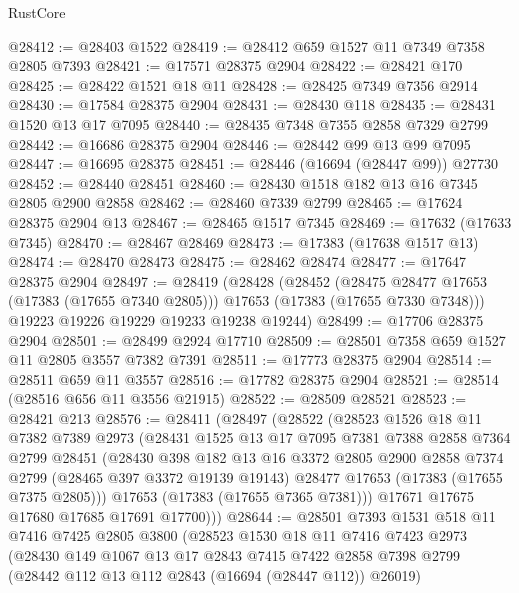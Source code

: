 \begin{lexlean}{RustCore}
\begin{coremodule}
@28412 := @28403 @1522
@28419 := @28412 @659 @1527 @11 @7349 @7358 @2805 @7393
@28421 := @17571 @28375 @2904
@28422 := @28421 @170
@28425 := @28422 @1521 @18 @11
@28428 := @28425 @7349 @7356 @2914
@28430 := @17584 @28375 @2904
@28431 := @28430 @118
@28435 := @28431 @1520 @13 @17 @7095
@28440 := @28435 @7348 @7355 @2858 @7329 @2799
@28442 := @16686 @28375 @2904
@28446 := @28442 @99 @13 @99 @7095
@28447 := @16695 @28375
@28451 := @28446 (@16694 (@28447 @99)) @27730
@28452 := @28440 @28451
@28460 := @28430 @1518 @182 @13 @16 @7345 @2805 @2900 @2858
@28462 := @28460 @7339 @2799
@28465 := @17624 @28375 @2904 @13
@28467 := @28465 @1517 @7345
@28469 := @17632 (@17633 @7345)
@28470 := @28467 @28469
@28473 := @17383 (@17638 @1517 @13)
@28474 := @28470 @28473
@28475 := @28462 @28474
@28477 := @17647 @28375 @2904
@28497 := @28419
    (@28428
      (@28452
        (@28475 @28477 @17653 (@17383 (@17655 @7340 @2805)))
        @17653
        (@17383 (@17655 @7330 @7348)))
      @19223
      @19226
      @19229
      @19233
      @19238
      @19244)
@28499 := @17706 @28375 @2904
@28501 := @28499 @2924 @17710
@28509 := @28501 @7358 @659 @1527 @11 @2805 @3557 @7382 @7391
@28511 := @17773 @28375 @2904
@28514 := @28511 @659 @11 @3557
@28516 := @17782 @28375 @2904
@28521 := @28514 (@28516 @656 @11 @3556 @21915)
@28522 := @28509 @28521
@28523 := @28421 @213
@28576 := @28411
    (@28497
      (@28522
        (@28523
          @1526
          @18
          @11
          @7382
          @7389
          @2973
          (@28431
            @1525
            @13
            @17
            @7095
            @7381
            @7388
            @2858
            @7364
            @2799
            @28451
            (@28430
              @398
              @182
              @13
              @16
              @3372
              @2805
              @2900
              @2858
              @7374
              @2799
              (@28465 @397 @3372 @19139 @19143)
              @28477
              @17653
              (@17383 (@17655 @7375 @2805)))
            @17653
            (@17383 (@17655 @7365 @7381)))
          @17671
          @17675
          @17680
          @17685
          @17691
          @17700)))
@28644 := @28501
    @7393
    @1531
    @518
    @11
    @7416
    @7425
    @2805
    @3800
    (@28523
      @1530
      @18
      @11
      @7416
      @7423
      @2973
      (@28430
        @149
        @1067
        @13
        @17
        @2843
        @7415
        @7422
        @2858
        @7398
        @2799
        (@28442 @112 @13 @112 @2843 (@16694 (@28447 @112)) @26019)

\end{coremodule}
\end{lexlean}
